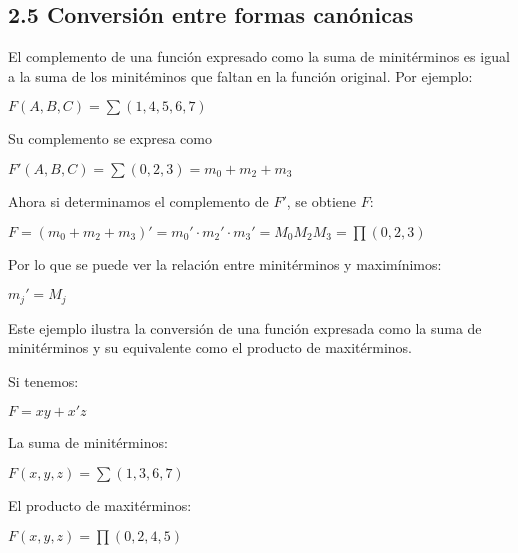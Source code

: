 \subsection*{2.5 Conversi\'{o}n entre formas can\'{o}nicas}
El complemento de una funci\'{o}n expresado como la suma de minit\'{e}rminos es igual
a la suma de los minit\'{e}minos que faltan en la funci\'{o}n original. Por ejemplo:

\begin{center}
    $F(A, B, C) = \sum(1, 4, 5, 6, 7)$
\end{center}
\begin{flushleft}
    Su complemento se expresa como
\end{flushleft}
\begin{center}
    $F'(A, B, C) = \sum(0, 2, 3) = m_0 + m_2 + m_3$
\end{center}

\begin{flushleft}
    Ahora si determinamos el complemento de $F'$, se obtiene $F$:
\end{flushleft}
\begin{center}
    $F = (m_0 + m_2 + m_3)' = m_0' \cdot m_2' \cdot  m_3' = M_0M_2M_3 = \prod(0, 2, 3)$
\end{center}

Por lo que se puede ver la relaci\'{o}n entre minit\'{e}rminos y
maxim\'{i}nimos:
\begin{center}
    $m_j' = M_j$
\end{center}

Este ejemplo ilustra la conversi\'{o}n de una funci\'{o}n expresada como la
suma de minit\'{e}rminos y su equivalente como el producto de maxit\'{e}rminos.

Si tenemos:
\begin{center}
    $F = xy + x'z$
\end{center}

\begin{flushleft}
    La suma de minit\'{e}rminos:
\end{flushleft}
\begin{center}
    $F(x, y, z) = \sum(1, 3, 6, 7)$
\end{center}
\begin{flushleft}
    El producto de maxit\'{e}rminos:
\end{flushleft}
\begin{center}
    $F(x, y, z) = \prod(0, 2, 4, 5)$
\end{center}
\newpage

